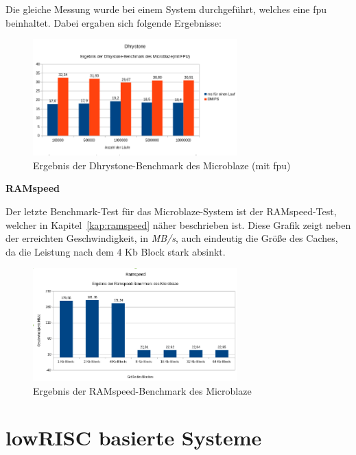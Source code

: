 Die gleiche Messung wurde bei einem System durchgeführt, welches eine \ac{fpu} beinhaltet. Dabei ergaben sich folgende Ergebnisse:\\

\begin{figure}[H]
\centering
\includegraphics[width=0.7\textwidth]{Hauptteil/dhrystonembmitfpu.png}
\caption{Ergebnis der Dhrystone-Benchmark des Microblaze (mit \ac{fpu})}
\label{fig:dhrystonembmitfpu}
\end{figure}

\textbf{RAMspeed}

Der letzte Benchmark-Test für das Microblaze-System ist der RAMspeed-Test, welcher in Kapitel~\ref{kap:ramspeed} näher beschrieben ist. Diese Grafik zeigt neben der
erreichten Geschwindigkeit, in \emph{MB/s}, auch eindeutig die Größe des Caches, da die Leistung nach dem 4 Kb Block stark absinkt.\\


\begin{figure}[H]
\centering
\includegraphics[width=0.7\textwidth]{Hauptteil/ramspeedmb.png}
\caption{Ergebnis der RAMspeed-Benchmark des Microblaze}
\label{fig:ramspeedmb}
\end{figure}



\section{lowRISC basierte Systeme}\label{kap:lowrisc}


